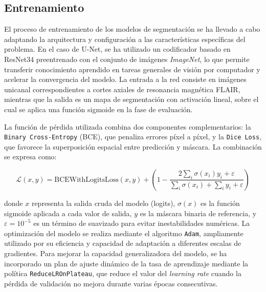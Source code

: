 \documentclass[../main.tex]{subfiles}
\begin{document}
\subsection{Entrenamiento}
El proceso de entrenamiento de los modelos de segmentación se ha llevado a cabo adaptando la arquitectura y configuración a las características específicas del problema. En el caso de U-Net, se ha utilizado un codificador basado en ResNet34 preentrenado con el conjunto de imágenes \textit{ImageNet}, lo que permite transferir conocimiento aprendido en tareas generales de visión por computador y acelerar la convergencia del modelo. La entrada a la red consiste en imágenes unicanal correspondientes a cortes axiales de resonancia magnética FLAIR, mientras que la salida es un mapa de segmentación con activación lineal, sobre el cual se aplica una función sigmoide en la fase de evaluación.

La función de pérdida utilizada combina dos componentes complementarios: la \texttt{Binary Cross-Entropy} (BCE), que penaliza errores píxel a píxel, y la \texttt{Dice Loss}, que favorece la superposición espacial entre predicción y máscara. La combinación se expresa como:

\begin{equation}
\mathcal{L}(x, y) = \text{BCEWithLogitsLoss}(x, y) + \left(1 - \frac{2 \sum_i \sigma(x_i) y_i + \varepsilon}{\sum_i \sigma(x_i) + \sum_i y_i + \varepsilon}\right)
\end{equation}

donde \(x\) representa la salida cruda del modelo (logits), \(\sigma(x)\) es la función sigmoide aplicada a cada valor de salida, \(y\) es la máscara binaria de referencia, y \(\varepsilon = 10^{-5}\) es un término de suavizado para evitar inestabilidades numéricas. La optimización del modelo se realiza mediante el algoritmo \texttt{Adam}, ampliamente utilizado por su eficiencia y capacidad de adaptación a diferentes escalas de gradientes. Para mejorar la capacidad generalizadora del modelo, se ha incorporado un plan de ajuste dinámico de la tasa de aprendizaje mediante la política \texttt{ReduceLROnPlateau}, que reduce el valor del \textit{learning rate} cuando la pérdida de validación no mejora durante varias épocas consecutivas.

\end{document}
